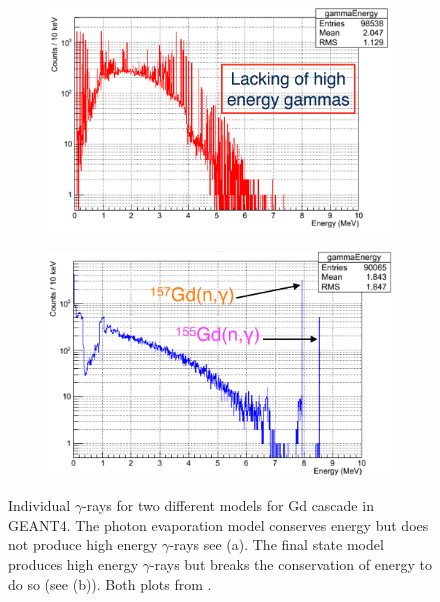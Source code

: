 \begin{figure}[!h]
\centering
\begin{subfigure}{.5\textwidth}
  \centering
  \includegraphics[width=\linewidth]{Chapter4/Figs/Raster/gadolinium/photonEvaporationGd.png}
  \captionsetup{width=.9\linewidth}
  \caption{}
  \label{subFig:differentGEANT4Models_photonEvaporationGd}
\end{subfigure}%
\begin{subfigure}{.5\textwidth}
  \centering
  \includegraphics[width=\linewidth]{Chapter4/Figs/Raster/gadolinium/FinalStateGd.png}
  \captionsetup{width=.9\linewidth}
  \caption{}
  \label{subFig:differentGEANT4Models_finalStateGd}
\end{subfigure}
\caption{Individual $\gamma$-rays for two different models for Gd cascade in GEANT4. The photon evaporation model conserves energy but does not produce high energy $\gamma$-rays see (a). The final state model produces high energy $\gamma$-rays but breaks the conservation of energy to do so (see (b)). Both plots from \cite{YuChen_2015}.}
\label{fig:differentGEANT4Models}
\end{figure}

